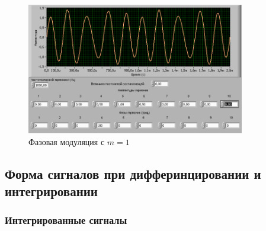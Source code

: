 \begin{figure}[H]
	\centering
	\includegraphics[width=0.85\textwidth]{pic/mod/mod4.png}
	\caption{Фазовая модуляция с  $m=1$}
\end{figure}
\subsection{Форма сигналов при дифферинцировании и интегрировании}
\subsubsection{Интегрированные сигналы}

